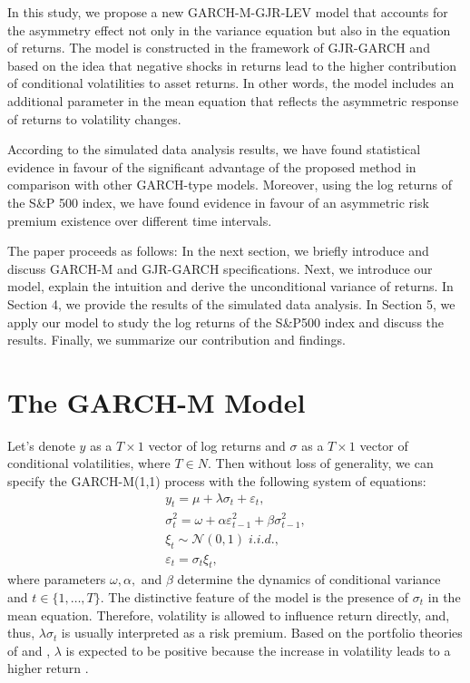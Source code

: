 \documentclass[authoryear, 1p]{elsarticle}
\numberwithin{equation}{section}
\begin{document}
In this study, we propose a new GARCH-M-GJR-LEV model that accounts for the asymmetry effect not only in the variance equation but also in the equation of returns. The model is constructed in the framework of GJR-GARCH and based on the idea that negative shocks in returns lead to the higher contribution of conditional volatilities to asset returns. In other words, the model includes an additional parameter in the mean equation that reflects the asymmetric response of returns to volatility changes.

According to the simulated data analysis results, we have found statistical evidence in favour of the significant advantage of the proposed method in comparison with other GARCH-type models. Moreover, using the log returns of the S\&P 500 index, we have found evidence in favour of an asymmetric risk premium existence over different time intervals.

The paper proceeds as follows: In the next section, we briefly introduce and discuss GARCH-M and GJR-GARCH specifications. Next, we introduce our model, explain the intuition and derive the unconditional variance of returns. In Section 4, we provide the results of the simulated data analysis. In Section 5, we apply our model to study the log returns of the S\&P500 index and discuss the results. Finally, we summarize our contribution and findings.

\section{The GARCH-M Model}\label{Section2}

Let's denote $y$ as a $T \times 1$ vector of log returns and $\sigma$ as a $T \times 1$ vector of conditional volatilities, where $T \in N$. Then without loss of generality, we can specify the GARCH-M(1,1) \citep{Engle1987} process with the following system of equations:
\begin{equation}
\begin{gathered}
y_{t} = \mu + \lambda \sigma_{t} + \varepsilon_{t}, \\ 
\sigma^2_{t} = \omega + \alpha \varepsilon^2_{t-1} + \beta \sigma^2_{t-1}, \\ 
\xi_{t} \sim \mathcal{N} \left(0,1\right) \; i.i.d., \\ 
\varepsilon_{t} = \sigma_{t} \xi_{t},  
\end{gathered}
\end{equation}
where parameters $\omega, \alpha,$ and $\beta$ determine the dynamics of conditional variance and $t\in\{1,\dots,T\}$. The distinctive feature of the model is the presence of $\sigma_{t}$ in the mean equation. Therefore, volatility is allowed to influence return directly, and, thus, $\lambda\sigma_{t}$ is usually interpreted as a risk premium. Based on the portfolio theories of \citep{Markowitz1952} and \citep{Sharpe1964}, $\lambda$ is expected to be positive because the increase in volatility leads to a higher return \citep{Engle1987}.
\end{document}
